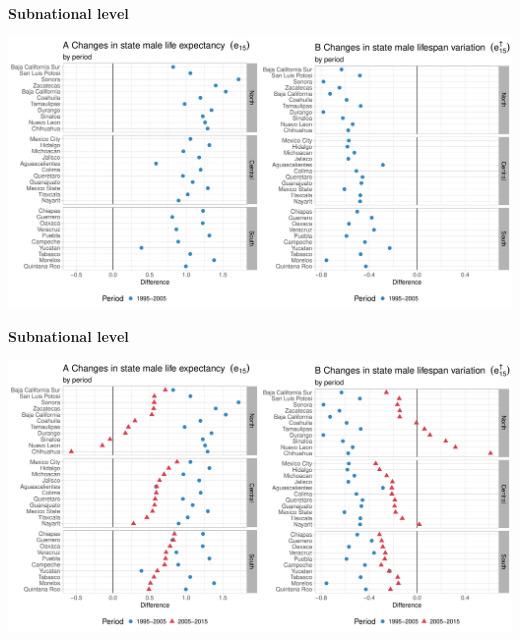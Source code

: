 \documentclass[xcolor={dvipsnames}]{beamer}
\begin{document}
\begin{frame}
\begin{center}
\Large{\textbf{Subnational level}}
\end{center}

\hspace*{-1cm}   
\includegraphics[scale=.38]{Figures/Figure_3_1}

\end{frame}


\begin{frame}
\begin{center}
\Large{\textbf{Subnational level}}
\end{center}

\hspace*{-1cm}   
\includegraphics[scale=.38]{Figures/Figure_3}

\end{frame}
\end{document}
